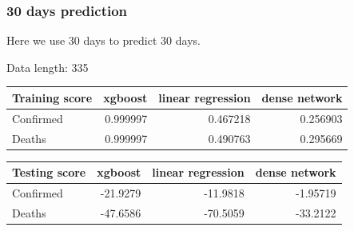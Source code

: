 \documentclass[a4paper,12pt]{article}
\begin{document}
\subsubsection{30 days prediction}
Here we use 30 days to predict 30 days.
\begin{tcolorbox}
    Data length:	 335

    \begin{tabular}{lrrr}
    \toprule
    Training score   &   xgboost &   linear regression &   dense network \\
    \midrule
    Confirmed        &  0.999997 &            0.467218 &        0.256903 \\
    Deaths           &  0.999997 &            0.490763 &        0.295669 \\
    \bottomrule
    \end{tabular}


    \begin{tabular}{lrrr}
    \toprule
    Testing score   &   xgboost &   linear regression &   dense network \\
    \midrule
    Confirmed       &  -21.9279 &            -11.9818 &        -1.95719 \\
    Deaths          &  -47.6586 &            -70.5059 &       -33.2122  \\
    \bottomrule
    \end{tabular}

\end{tcolorbox}
\end{document}
